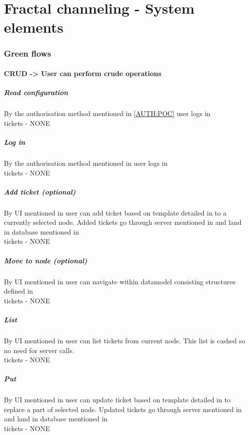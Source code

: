 \part{Fractal channeling - System elements}
\section{Green flows}
\subsection{CRUD -> User can perform crude operations}
\subsubsection{Read configuration}\label{GF:config}
By the authorisation method mentioned in \ref{AUTH:POC} user logs in \\
tickets - NONE
\subsubsection{Log in}\label{GF:LOGIN}
By the authorisation method mentioned in  user logs in \\
tickets - NONE
\subsubsection{Add ticket (optional)}\label{GF:ADD}
By UI mentioned in  user can add ticket based on template detailed in  
to a currently selected node. Added tickets go through server mentioned in  and land in database mentioned in \\
tickets - NONE
\subsubsection{Move to node (optional)}
By UI mentioned in  user can navigate within datamodel consisting structures defined in \\
tickets - NONE
\subsubsection{List}
By UI mentioned in  user can list tickets from current node. This list is cashed so no need for server calls.\\
tickets - NONE
\subsubsection{Put}
By UI mentioned in  user can update ticket based on template detailed in  
to replace a part of selected node. Updated tickets go through server mentioned in  and land in database mentioned in \\
tickets - NONE
